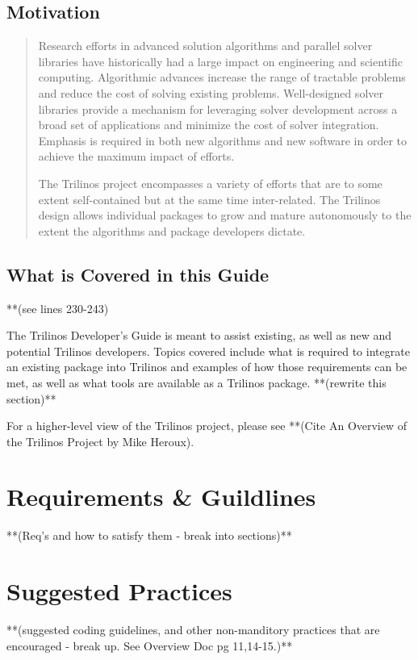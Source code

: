 \documentclass[12pt]{report}
\begin{document}
	\section{Motivation}
	\begin{quote}
Research efforts in advanced solution algorithms and parallel solver
libraries have historically had a large impact on engineering and
scientific computing.  Algorithmic advances increase the range
of tractable problems and reduce the cost of solving existing
problems.  Well-designed solver libraries provide a mechanism for
leveraging solver development across a broad set of applications and
minimize the cost of solver integration.  Emphasis is
required in both new algorithms and new software in order
to achieve the maximum impact of efforts.

The Trilinos project encompasses a variety of efforts that are to some
extent self-contained but at the same time inter-related.  The
Trilinos design allows individual packages to grow and mature
autonomously to the extent the algorithms and package developers
dictate. 
	\end{quote}

	\section{What is Covered in this Guide}
**(see lines 230-243)

The Trilinos Developer's Guide is meant to assist existing, as well as new and
potential Trilinos developers.  Topics covered include what is required to
integrate an existing package into Trilinos and examples of how those 
requirements can be met, as well as what tools are available as a Trilinos
package.  **(rewrite this section)**

For a higher-level view of the Trilinos project, please see **(Cite An Overview
of the Trilinos Project by Mike Heroux). 


	\chapter{Requirements \& Guildlines}
	**(Req's and how to satisfy them - break into sections)**



	\chapter{Suggested Practices}
	**(suggested coding guidelines, and other non-manditory practices that are encouraged - break up.  See Overview Doc pg 11,14-15.)**
	
\end{document}
